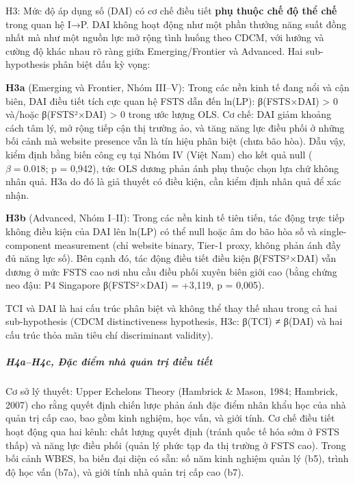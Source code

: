 \documentclass[12pt,a4paper]{article}
\begin{document}
H3: Mức độ áp dụng số (DAI) có cơ chế điều tiết \textbf{phụ thuộc chế độ
thể chế} trong quan hệ I→P. DAI không hoạt động như một phần thưởng năng
suất đồng nhất mà như một nguồn lực mở rộng tình huống theo CDCM, với
hướng và cường độ khác nhau rõ ràng giữa Emerging/Frontier và Advanced.
Hai sub-hypothesis phân biệt dấu kỳ vọng:

\textbf{H3a} (Emerging và Frontier, Nhóm III--V): Trong các nền kinh tế
đang nổi và cận biên, DAI điều tiết tích cực quan hệ FSTS dẫn đến
ln(LP): β(FSTS×DAI) \textgreater{} 0 và/hoặc β(FSTS²×DAI) \textgreater{}
0 trong ước lượng OLS. Cơ chế: DAI giảm khoảng cách tâm lý, mở rộng tiếp
cận thị trường ảo, và tăng năng lực điều phối ở những bối cảnh mà
website presence vẫn là tín hiệu phân biệt (chưa bão hòa). Dẫu vậy, kiểm
định bằng biến công cụ tại Nhóm IV (Việt Nam) cho kết quả null
(\(\beta = 0.018\); p = 0,942), tức OLS dương phản ánh phụ thuộc chọn
lựa chứ không nhân quả. H3a do đó là giả thuyết có điều kiện, cần kiểm
định nhân quả để xác nhận.

\textbf{H3b} (Advanced, Nhóm I--II): Trong các nền kinh tế tiên tiến,
tác động trực tiếp không điều kiện của DAI lên ln(LP) có thể null hoặc
âm do bão hòa số và single-component measurement (chỉ website binary,
Tier-1 proxy, không phản ánh đầy đủ năng lực số). Bên cạnh đó, tác động
điều tiết điều kiện β(FSTS²×DAI) vẫn dương ở mức FSTS cao nơi nhu cầu
điều phối xuyên biên giới cao (bằng chứng neo đậu: P4 Singapore
β(FSTS²×DAI) = +3,119, p = 0,005).

TCI và DAI là hai cấu trúc phân biệt và không thể thay thế nhau trong cả
hai sub-hypothesis (CDCM distinctiveness hypothesis, H3c: β(TCI) ≠
β(DAI) và hai cấu trúc thỏa mãn tiêu chí discriminant validity).

\hypertarget{h4ah4c-ux111ux1eb7c-ux111iux1ec3m-nhuxe0-quux1ea3n-trux1ecb-ux111iux1ec1u-tiux1ebft}{%
\subparagraph{H4a--H4c, Đặc điểm nhà quản trị điều
tiết}\label{h4ah4c-ux111ux1eb7c-ux111iux1ec3m-nhuxe0-quux1ea3n-trux1ecb-ux111iux1ec1u-tiux1ebft}}

Cơ sở lý thuyết: Upper Echelons Theory (Hambrick \& Mason, 1984;
Hambrick, 2007) cho rằng quyết định chiến lược phản ánh đặc điểm nhân
khẩu học của nhà quản trị cấp cao, bao gồm kinh nghiệm, học vấn, và giới
tính. Cơ chế điều tiết hoạt động qua hai kênh: chất lượng quyết định
(tránh quốc tế hóa sớm ở FSTS thấp) và năng lực điều phối (quản lý phức
tạp đa thị trường ở FSTS cao). Trong bối cảnh WBES, ba biến đại diện có
sẵn: số năm kinh nghiệm quản lý (b5), trình độ học vấn (b7a), và giới
tính nhà quản trị cấp cao (b7).
\end{document}
